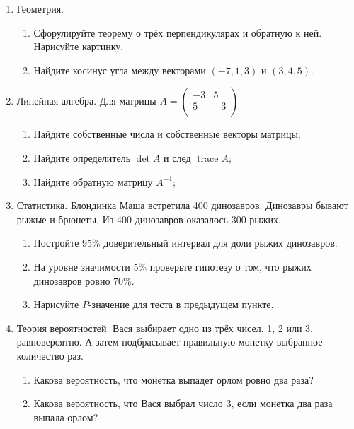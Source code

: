 \documentclass[12pt]{article}
\DeclareMathOperator{\tr}{trace}
\begin{document}
 



\begin{enumerate}

  \item Геометрия.
  \begin{enumerate}
    \item Сфорулируйте теорему о трёх перпендикулярах и обратную к ней. Нарисуйте картинку.
    \item Найдите косинус угла между векторами $(-7, 1, 3)$ и $(3, 4, 5)$.
  \end{enumerate}
  

  \item Линейная алгебра. Для матрицы
$
  A=\begin{pmatrix}
  -3 & 5  \\
  5 & -3  \\
  \end{pmatrix}
$

  \begin{enumerate}
  \item Найдите собственные числа и собственные векторы матрицы;
  \item Найдите определитель $\det A$ и след $\tr A$;
 \item Найдите обратную матрицу $A^{-1}$;
  \end{enumerate}


  \item Статистика. Блондинка Маша встретила 400 динозавров. 
  Динозавры бывают рыжые и брюнеты. Из 400 динозавров оказалось 300 рыжих. 

  \begin{enumerate}
    \item Постройте 95\% доверительный интервал для доли рыжих динозавров.
    \item На уровне значимости 5\% проверьте гипотезу о том, что рыжих динозавров ровно 70\%.
    \item Нарисуйте $P$-значение для теста в предыдущем пункте.
  \end{enumerate}

 \item Теория вероятностей. Вася выбирает одно из трёх чисел, 1, 2 или 3, равновероятно.
 А затем подбрасывает правильную монетку выбранное количество раз. 
 \begin{enumerate}
   \item Какова вероятность, что монетка выпадет орлом ровно два раза?
   \item Какова вероятность, что Вася выбрал число 3, если монетка два раза выпала орлом?
 \end{enumerate}

\end{enumerate}
\end{document}
